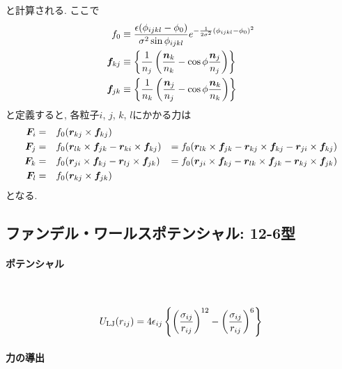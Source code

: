 と計算される. ここで
\begin{align}
   f_{0}
   &\equiv
   \frac{\epsilon(\phi_{ijkl} - \phi_{0})}{\sigma^{2} \sin \phi_{ijkl}}
   e^{-\frac{1}{2\sigma^{2}}(\phi_{ijkl} - \phi_{0})^{2}}
   \notag \\
   \bm{f}_{kj}
   &\equiv
   \left\{
      \frac{1}{n_{j}}
      \left(
             \frac{\bm{n}_{k}}{n_{k}} - \cos\phi \frac{\bm{n}_{j}}{n_{j}}
      \right)
   \right\}
   \notag \\
   \bm{f}_{jk}
   &\equiv
   \left\{
      \frac{1}{n_{k}}
      \left(
             \frac{\bm{n}_{j}}{n_{j}} - \cos\phi \frac{\bm{n}_{k}}{n_{k}}
      \right)
   \right\}
   \notag
\end{align}
と定義すると, 各粒子$i$, $j$, $k$, $l$にかかる力は
\begin{alignat}{5}
   \bm{F}_{i}
   &=
   &&
   f_{0} (\bm{r}_{kj} \times \bm{f}_{kj})
   \notag \\
   \bm{F}_{j}
   &=
   &&
   f_{0} (\bm{r}_{lk} \times \bm{f}_{jk} - \bm{r}_{ki} \times \bm{f}_{kj})
   &=
   f_{0}
   ( \bm{r}_{lk} \times \bm{f}_{jk}
   - \bm{r}_{kj} \times \bm{f}_{kj}
   - \bm{r}_{ji} \times \bm{f}_{kj} )
   \notag \\
   \bm{F}_{k}
   &=&&
   f_{0} (\bm{r}_{ji} \times \bm{f}_{kj} - \bm{r}_{lj} \times \bm{f}_{jk})
   &=
   f_{0}
   ( \bm{r}_{ji} \times \bm{f}_{kj}
   - \bm{r}_{lk} \times \bm{f}_{jk}
   - \bm{r}_{kj} \times \bm{f}_{jk})
   \notag \\
   \bm{F}_{l}
   &=&&
   f_{0} (\bm{r}_{kj} \times \bm{f}_{jk})
   \notag
\end{alignat}
となる.

\clearpage
\subsection{ファンデル・ワールスポテンシャル: 12-6型}
\paragraph{ポテンシャル} \

\begin{align}
   U_{\mathrm{LJ}}(r_{ij})
 =
   4\epsilon_{ij}
   \left\{
           \left(\frac{\sigma_{ij}}{r_{ij}}\right)^{12}
          -\left(\frac{\sigma_{ij}}{r_{ij}}\right)^{6}
   \right\}
 \notag
\end{align}
\paragraph{力の導出} \

